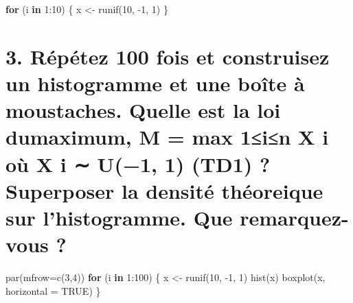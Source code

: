 \documentclass[
]{article}
\newenvironment{Shaded}{\begin{snugshade}}{\end{snugshade}}
\newcommand{\AttributeTok}[1]{\textcolor[rgb]{0.77,0.63,0.00}{#1}}
\newcommand{\ConstantTok}[1]{\textcolor[rgb]{0.00,0.00,0.00}{#1}}
\newcommand{\ControlFlowTok}[1]{\textcolor[rgb]{0.13,0.29,0.53}{\textbf{#1}}}
\newcommand{\DecValTok}[1]{\textcolor[rgb]{0.00,0.00,0.81}{#1}}
\newcommand{\FunctionTok}[1]{\textcolor[rgb]{0.00,0.00,0.00}{#1}}
\newcommand{\NormalTok}[1]{#1}
\newcommand{\OtherTok}[1]{\textcolor[rgb]{0.56,0.35,0.01}{#1}}
\newcommand{\SpecialCharTok}[1]{\textcolor[rgb]{0.00,0.00,0.00}{#1}}
\begin{document}
\begin{Shaded}
\begin{Highlighting}[]
\ControlFlowTok{for}\NormalTok{ (i }\ControlFlowTok{in} \DecValTok{1}\SpecialCharTok{:}\DecValTok{10}\NormalTok{) \{}
\NormalTok{  x }\OtherTok{\textless{}{-}} \FunctionTok{runif}\NormalTok{(}\DecValTok{10}\NormalTok{, }\SpecialCharTok{{-}}\DecValTok{1}\NormalTok{, }\DecValTok{1}\NormalTok{)}
\NormalTok{\}}
\end{Highlighting}
\end{Shaded}

\hypertarget{ruxe9puxe9tez-100-fois-et-construisez-un-histogramme-et-une-bouxeete-uxe0-moustaches.-quelle-est-la-loi-dumaximum-m-max-1in-x-i-ouxf9-x-i-u1-1-td1-superposer-la-densituxe9-thuxe9oreique-sur-lhistogramme.-que-remarquez-vous}{%
\section{3. Répétez 100 fois et construisez un histogramme et une boîte
à moustaches. Quelle est la loi dumaximum, M = max 1≤i≤n X i où X i ∼
U(−1, 1) (TD1) ? Superposer la densité théoreique sur l'histogramme. Que
remarquez-vous
?}\label{ruxe9puxe9tez-100-fois-et-construisez-un-histogramme-et-une-bouxeete-uxe0-moustaches.-quelle-est-la-loi-dumaximum-m-max-1in-x-i-ouxf9-x-i-u1-1-td1-superposer-la-densituxe9-thuxe9oreique-sur-lhistogramme.-que-remarquez-vous}}

\begin{Shaded}
\begin{Highlighting}[]
\FunctionTok{par}\NormalTok{(}\AttributeTok{mfrow=}\FunctionTok{c}\NormalTok{(}\DecValTok{3}\NormalTok{,}\DecValTok{4}\NormalTok{))}
\ControlFlowTok{for}\NormalTok{ (i }\ControlFlowTok{in} \DecValTok{1}\SpecialCharTok{:}\DecValTok{100}\NormalTok{) \{}
\NormalTok{  x }\OtherTok{\textless{}{-}} \FunctionTok{runif}\NormalTok{(}\DecValTok{10}\NormalTok{, }\SpecialCharTok{{-}}\DecValTok{1}\NormalTok{, }\DecValTok{1}\NormalTok{)}
  \FunctionTok{hist}\NormalTok{(x)}
  \FunctionTok{boxplot}\NormalTok{(x, }\AttributeTok{horizontal =} \ConstantTok{TRUE}\NormalTok{)}
\NormalTok{\}}
\end{Highlighting}
\end{Shaded}
\end{document}
